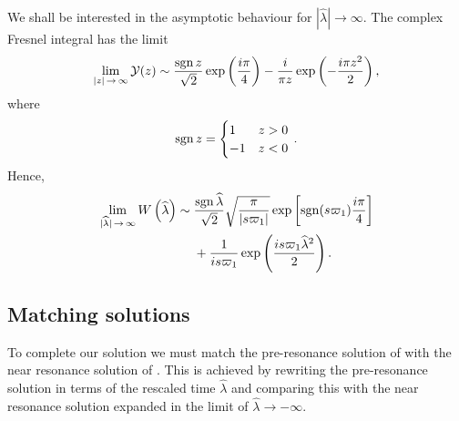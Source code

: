 We shall be interested in the asymptotic behaviour for $|\widehat{\lambda}| \rightarrow \infty$. The complex Fresnel integral has the limit~\cite{Olver2010} %
\begin{equation}
\lim_{|z|\,\rightarrow\,\infty} \mathcal{Y}(z) \sim \dfrac{\operatorname{sgn} z}{\sqrt{2}} \exp\left(\dfrac{i\pi}{4}\right) - \dfrac{i}{\pi z}\exp\left(-\dfrac{i\pi z^2}{2}\right),
\end{equation}
where 
\begin{equation}
\operatorname{sgn} z = \begin{cases}
1 & z > 0 \\
-1 & z < 0
\end{cases}\,.
\end{equation}
Hence,
\begin{align}
\lim_{|\widehat{\lambda}|\,\rightarrow\,\infty}W\left(\widehat{\lambda}\right) \sim {} & \dfrac{\operatorname{sgn} \widehat{\lambda}}{\sqrt{2}}\sqrt{\dfrac{\pi}{|s\varpi_1|}}\exp\left[\operatorname{sgn}(s\varpi_1)\dfrac{i\pi}{4}\right] \nonumber \\
  {} & + \frac{1}{is\varpi_1}\exp\left(\dfrac{is \varpi_1 \widehat{\lambda}^2}{2}\right).
\label{eq:Fres-limit}
\end{align}

\subsection{Matching solutions}

To complete our solution we must match the pre-resonance solution of  with the near resonance solution of . This is achieved by rewriting the pre-resonance solution in terms of the rescaled time $\widehat{\lambda}$ and comparing this with the near resonance solution expanded in the limit of $\widehat{\lambda} \rightarrow -\infty$.

